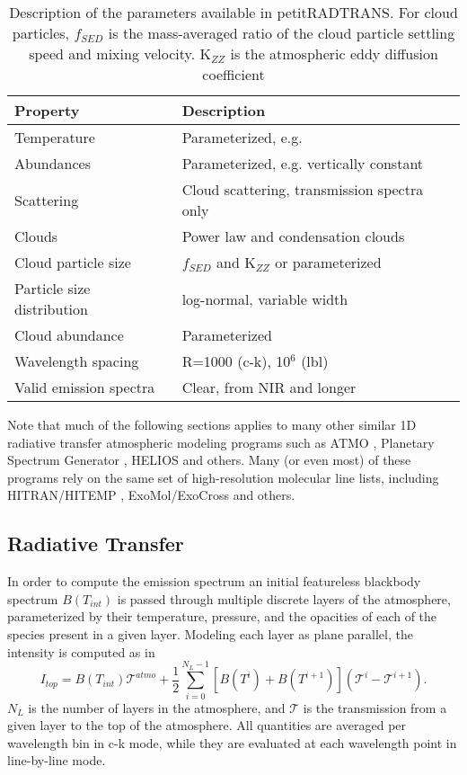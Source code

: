 \begin{table}[t]
	\centering
	\begin{tabular}{ll}
		\toprule
		\textbf{Property} & \textbf{Description}\\
		\midrule
		Temperature & Parameterized, e.g. \parencite{Guillot2010}\\
		Abundances & Parameterized, e.g. vertically constant\\
		Scattering & Cloud scattering, transmission spectra only\\
		Clouds & Power law and condensation clouds\\
		Cloud particle size & $f_{SED}$ and K$_{ZZ}$ or parameterized\\
		Particle size distribution & log-normal, variable width\\
		Cloud abundance & Parameterized\\
		Wavelength spacing & R=1000 (c-k), 10$^{6}$ (lbl)\\
		Valid emission spectra & Clear, from NIR and longer\\
		\bottomrule
	\end{tabular}
	\caption{Description of the parameters available in petitRADTRANS. For cloud particles, $f_{SED}$ is the mass-averaged ratio of the cloud particle settling speed and mixing velocity. K$_{ZZ}$ is the atmospheric eddy diffusion coefficient \parencite{Ackerman2001}}
	\label{tab:petitradparams}
\end{table}

Note that much of the following sections applies to many other similar 1D radiative transfer atmospheric modeling programs such as ATMO \parencite{Goyal2019}, Planetary Spectrum Generator \parencite{Villanueva2018}, HELIOS \parencite{Malik2017,Malik2019} and others.
Many (or even most) of these programs rely on the same set of high-resolution molecular line lists, including HITRAN/HITEMP \parencite{Rothman1981,Rothman2010,Gordon2017}, ExoMol/ExoCross \parencite{Tennyson2016,Tennyson2017,Yurchenko2018} and others. 

\subsection{Radiative Transfer}
In order to compute the emission spectrum an initial featureless blackbody spectrum $B(T_{int})$ is passed through multiple discrete layers of the atmosphere, parameterized by their temperature, pressure, and the opacities of each of the species present in a given layer.
Modeling each layer as plane parallel, the intensity is computed as in \parencite{Irwin2008,Molliere2017,Molliere2019}
\begin{equation}
I_{top} = B(T_{int})\mathcal{T}^{atmo} + \frac{1}{2}\sum_{i=0}^{N_{L}-1}\left[B(T^{i}) + B(T^{i+1})\right]\left(\mathcal{T}^{i}-\mathcal{T}^{i+1}\right).
\end{equation}
$N_{L}$ is the number of layers in the atmosphere, and $\mathcal{T}$ is the transmission from a given layer to the top of the atmosphere. All quantities are averaged per wavelength bin in c-k mode, while they are evaluated at each wavelength point in line-by-line mode.

